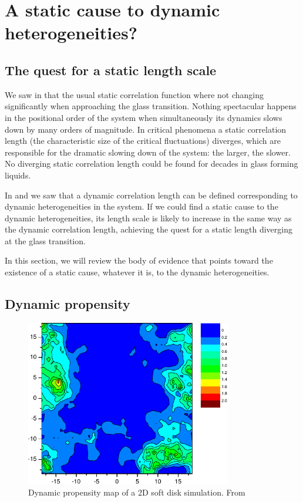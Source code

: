 \section{A static cause to dynamic heterogeneities?}
\label{sec:static_cause}

\subsection{The quest for a static length scale}
\label{sec:static_length}

We saw in  that the usual static correlation function where not changing significantly when approaching the glass transition. Nothing spectacular happens in the positional order of the system when simultaneously its dynamics slows down by many orders of magnitude. In critical phenomena a static correlation length (the characteristic size of the critical fluctuations) diverges, which are responsible for the dramatic slowing down of the system: the larger, the slower. No diverging static correlation length could be found for decades in glass forming liquids.

In  and  we saw that a dynamic correlation length can be defined corresponding to dynamic heterogeneities in the system. If we could find a static cause to the dynamic heterogeneities, its length scale is likely to increase in the same way as the dynamic correlation length, achieving the quest for a static length diverging at the glass transition.

In this section, we will review the body of evidence that points toward the existence of a static cause, whatever it is, to the dynamic heterogeneities.

\subsection{Dynamic propensity}
\label{sec:propensity}

\begin{figure}
	\centering
	\includegraphics[width=0.8\textwidth]{propensity}
	\caption{Dynamic propensity map of a 2D soft disk simulation. From~\citep{Widmer-Cooper2005}}
	\label{fig:propensity}
\end{figure}

